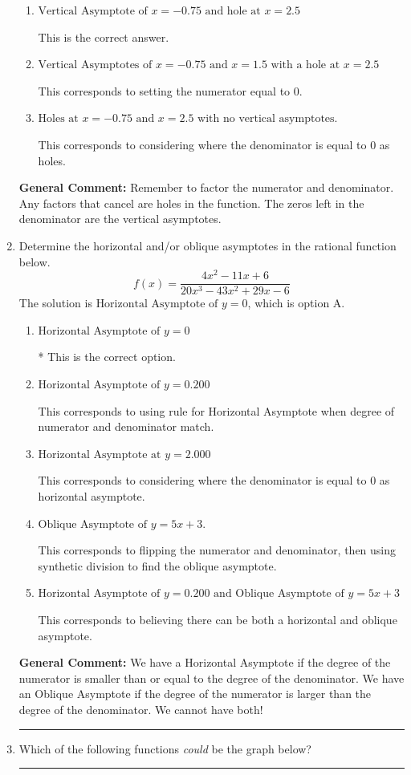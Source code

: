 \documentclass{extbook}[14pt]
\newcommand{\litem}[1]{\item #1

\rule{\textwidth}{0.4pt}}
\begin{document}
\begin{enumerate}
{\begin{enumerate}[label=\Alph*.]
This corresponds to not factoring out the hole.
\item \( \text{Vertical Asymptote of } x = -0.75 \text{ and hole at } x = 2.5 \)

This is the correct answer.
\item \( \text{Vertical Asymptotes of } x = -0.75 \text{ and } x = 1.5 \text{ with a hole at } x = 2.5 \)

This corresponds to setting the numerator equal to 0.
\item \( \text{Holes at } x = -0.75 \text{ and } x = 2.5 \text{ with no vertical asymptotes.} \)

This corresponds to considering where the denominator is equal to 0 as holes.
\end{enumerate}

\textbf{General Comment:} Remember to factor the numerator and denominator. Any factors that cancel are holes in the function. The zeros left in the denominator are the vertical asymptotes.
}
\litem{
Determine the horizontal and/or oblique asymptotes in the rational function below.
\[ f(x) = \frac{4x^{2} -11 x + 6}{20x^{3} -43 x^{2} +29 x -6} \]The solution is \( \text{Horizontal Asymptote of } y = 0 \), which is option A.\begin{enumerate}[label=\Alph*.]
\item \( \text{Horizontal Asymptote of } y = 0 \)

* This is the correct option.
\item \( \text{Horizontal Asymptote of } y = 0.200  \)

This corresponds to using rule for Horizontal Asymptote when degree of numerator and denominator match.
\item \( \text{Horizontal Asymptote at } y = 2.000 \)

This corresponds to considering where the denominator is equal to 0 as horizontal asymptote.
\item \( \text{Oblique Asymptote of } y = 5x + 3. \)

This corresponds to flipping the numerator and denominator, then using synthetic division to find the oblique asymptote.
\item \( \text{Horizontal Asymptote of } y = 0.200 \text{ and Oblique Asymptote of } y = 5x + 3 \)

This corresponds to believing there can be both a horizontal and oblique asymptote.
\end{enumerate}

\textbf{General Comment:} We have a Horizontal Asymptote if the degree of the numerator is smaller than or equal to the degree of the denominator. We have an Oblique Asymptote if the degree of the numerator is larger than the degree of the denominator. We cannot have both!
}
\litem{
Which of the following functions \textit{could} be the graph below?

}
\end{enumerate}
\end{document}
